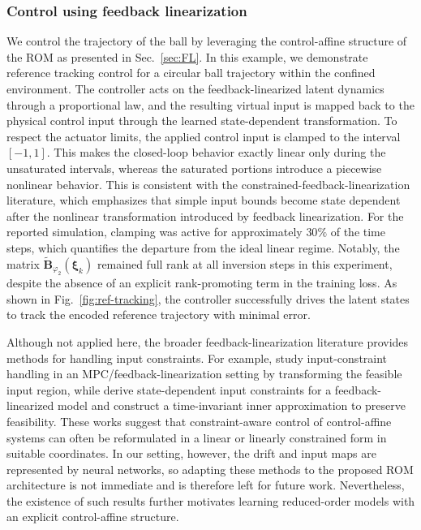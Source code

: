 \documentclass{article}
\begin{document}
\subsubsection{Control using feedback linearization}
We control the trajectory of the ball by leveraging the control-affine structure of the ROM as presented in Sec.~\ref{sec:FL}.
In this example, we demonstrate reference tracking control for a circular ball trajectory within the confined environment. 
The controller acts on the feedback-linearized latent dynamics through a proportional law, and the resulting virtual input is mapped back to the physical control input through the learned state-dependent transformation.
To respect the actuator limits, the applied control input is clamped to the interval $[-1,1]$.
This makes the closed-loop behavior exactly linear only during the unsaturated intervals, whereas the saturated portions introduce a piecewise nonlinear behavior.
This is consistent with the constrained-feedback-linearization literature, which emphasizes that simple input bounds become state dependent after the nonlinear transformation introduced by feedback linearization.
For the reported simulation, clamping was active for approximately $30\%$ of the time steps, which quantifies the departure from the ideal linear regime.
Notably, the matrix $\widetilde{\mathbf{B}}_{\varphi_2}(\boldsymbol{\xi}_k)$ remained full rank at all inversion steps in this experiment, despite the absence of an explicit rank-promoting term in the training loss.
As shown in Fig.~\ref{fig:ref-tracking}, the controller successfully drives the latent states to track the encoded reference trajectory with minimal error.

Although not applied here, the broader feedback-linearization literature provides methods for handling input constraints.
For example, \cite{deng2009input} study input-constraint handling in an MPC/feedback-linearization setting by transforming the feasible input region, while \cite{tiriolo2024feedback} derive state-dependent input constraints for a feedback-linearized model and construct a time-invariant inner approximation to preserve feasibility.
These works suggest that constraint-aware control of control-affine systems can often be reformulated in a linear or linearly constrained form in suitable coordinates.
In our setting, however, the drift and input maps are represented by neural networks, so adapting these methods to the proposed ROM architecture is not immediate and is therefore left for future work.
Nevertheless, the existence of such results further motivates learning reduced-order models with an explicit control-affine structure.
\end{document}
